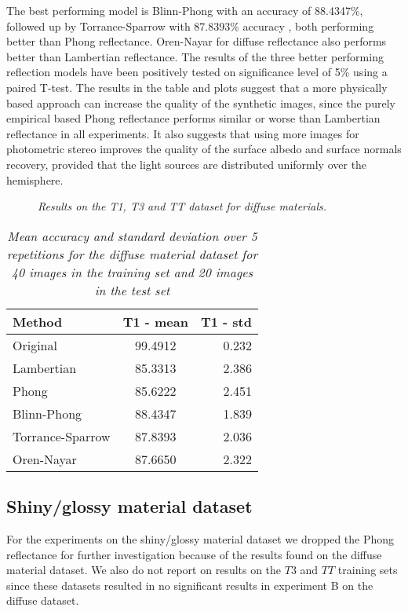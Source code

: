 The best performing model is Blinn-Phong with an accuracy of 88.4347\%, followed up by Torrance-Sparrow with 87.8393\% accuracy , both performing better than Phong reflectance. Oren-Nayar for diffuse reflectance also performs better than Lambertian reflectance. The results of the three better performing reflection models have been positively tested on significance level of 5\% using a paired T-test. The results in the table and plots suggest that a more physically based approach can increase the quality of the synthetic images, since the purely empirical based Phong reflectance performs similar or worse than Lambertian reflectance in all experiments. It also suggests that using more images for photometric stereo improves the quality of the surface albedo and surface normals recovery, provided that the light sources are distributed uniformly over the hemisphere.

\begin{figure}[H]
	\begin{center}
	\end{center}
	\caption{{\it Results on the T1, T3 and TT dataset for diffuse materials.}}
	\label{fig:DiffusePlotB}
\end{figure}

\begin{table}
	\center
	\begin{tabular}{l|c|r}
	Method 				&	T1 - mean 	& T1 - std \\
	\hline
	Original			&	99.4912		& 0.232 \\
	Lambertian 			&	85.3313		& 2.386 \\
	Phong 				&	85.6222		& 2.451 \\
	Blinn-Phong 		& 	88.4347 	& 1.839 \\
	Torrance-Sparrow 	&	87.8393 	& 2.036 \\
	Oren-Nayar 			&	87.6650 	& 2.322 \\
	\end{tabular}
	\caption{{\it Mean accuracy and standard deviation over 5 repetitions for the diffuse material dataset for 40 images in the training set and 20 images in the test set}}
	\label{tab:DiffuseResultsB}
\end{table}

\subsection{Shiny/glossy material dataset}
For the experiments on the shiny/glossy material dataset we dropped the Phong reflectance for further investigation because of the results found on the diffuse material dataset. We also do not report on results on the $T3$ and $TT$ training sets since these datasets resulted in no significant results in experiment B on the diffuse dataset.

